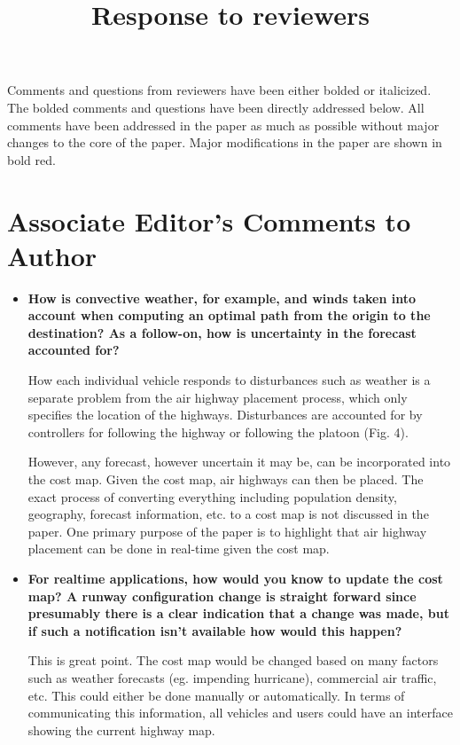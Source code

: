 \documentclass[submit]{aiaa-pretty}
\title{Response to reviewers}
\begin{document}
\maketitle

Comments and questions from reviewers have been either bolded or italicized. The bolded comments and questions have been directly addressed below. All comments have been addressed in the paper as much as possible without major changes to the core of the paper. Major modifications in the paper are shown in bold red.

\section{Associate Editor's Comments to Author}
\begin{itemize}
\item\textbf{How is convective weather, for example, and winds taken into account when computing an optimal path from the origin to the destination?  As a follow-on, how is uncertainty in the forecast accounted for?}

How each individual vehicle responds to disturbances such as weather is a separate problem from the air highway placement process, which only specifies the location of the highways. Disturbances are accounted for by controllers for following the highway or following the platoon (Fig. 4). 

However, any forecast, however uncertain it may be, can be incorporated into the cost map. Given the cost map, air highways can then be placed. The exact process of converting everything including population density, geography, forecast information, etc. to a cost map is not discussed in the paper. One primary purpose of the paper is to highlight that air highway placement can be done in real-time given the cost map.

\item\textbf{For realtime applications, how would you know to update the cost map?  A runway configuration change is straight forward since presumably there is a clear indication that a change was made, but if such a notification isn’t available how would this happen?}

This is great point. The cost map would be changed based on many factors such as weather forecasts (eg. impending hurricane), commercial air traffic, etc. This could either be done manually or automatically. In terms of communicating this information, all vehicles and users could have an interface showing the current highway map. 


\end{itemize}
\end{document}
